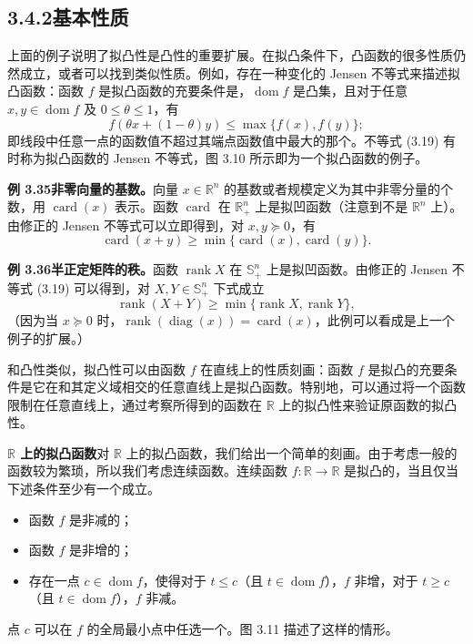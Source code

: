 \documentclass[UTF8, 12pt, fontset=fandol, oneside]{ctexart}
\DeclareMathOperator{\dom}{dom}
\begin{document}
\subsection*{3.4.2\quad 基本性质}

上面的例子说明了拟凸性是凸性的重要扩展。在拟凸条件下，凸函数的很多性质仍然成立，或者可以找到类似性质。例如，存在一种变化的 Jensen 不等式来描述拟凸函数：函数 $f$ 是拟凸函数的充要条件是，$\dom f$ 是凸集，且对于任意 $x,y\in\dom f$ 及 $0\leq\theta\leq1$，有
\begin{equation}
f(\theta x+(1-\theta)y)\leq\max\{f(x),f(y)\};
\tag{3.19}
\end{equation}
即线段中任意一点的函数值不超过其端点函数值中最大的那个。不等式 (3.19) 有时称为拟凸函数的 Jensen 不等式，图 3.10 所示即为一个拟凸函数的例子。

\noindent\textbf{例 3.35\quad 非零向量的基数。}\quad 向量 $x\in\mathbb{R}^n$ 的基数或者规模定义为其中非零分量的个数，用 $\operatorname{card}(x)$ 表示。函数 $\operatorname{card}$ 在 $\mathbb{R}_+^n$ 上是拟凹函数（注意到不是 $\mathbb{R}^n$ 上）。由修正的 Jensen 不等式可以立即得到，对 $x,y\succeq0$，有
\[
\operatorname{card}(x+y)\geq\min\{\operatorname{card}(x),\operatorname{card}(y)\}.
\]

\noindent\textbf{例 3.36\quad 半正定矩阵的秩。}\quad 函数 $\operatorname{rank}X$ 在 $\mathbb{S}_+^n$ 上是拟凹函数。由修正的 Jensen 不等式 (3.19) 可以得到，对 $X,Y\in\mathbb{S}_+^n$ 下式成立
\[
\operatorname{rank}(X+Y)\geq\min\{\operatorname{rank}X,\operatorname{rank}Y\},
\]
（因为当 $x\succeq0$ 时，$\operatorname{rank}(\operatorname{diag}(x))=\operatorname{card}(x)$，此例可以看成是上一个例子的扩展。）

和凸性类似，拟凸性可以由函数 $f$ 在直线上的性质刻画：函数 $f$ 是拟凸的充要条件是它在和其定义域相交的任意直线上是拟凸函数。特别地，可以通过将一个函数限制在任意直线上，通过考察所得到的函数在 $\mathbb{R}$ 上的拟凸性来验证原函数的拟凸性。

\noindent\textbf{$\mathbb{R}$ 上的拟凸函数}\quad 对 $\mathbb{R}$ 上的拟凸函数，我们给出一个简单的刻画。由于考虑一般的函数较为繁琐，所以我们考虑连续函数。连续函数 $f:\mathbb{R}\to\mathbb{R}$ 是拟凸的，当且仅当下述条件至少有一个成立。
\begin{itemize}
\item 函数 $f$ 是非减的；
\item 函数 $f$ 是非增的；
\item 存在一点 $c\in\dom f$，使得对于 $t\leq c$（且 $t\in\dom f$），$f$ 非增，对于 $t\geq c$（且 $t\in\dom f$），$f$ 非减。
\end{itemize}
点 $c$ 可以在 $f$ 的全局最小点中任选一个。图 3.11 描述了这样的情形。
\end{document}
